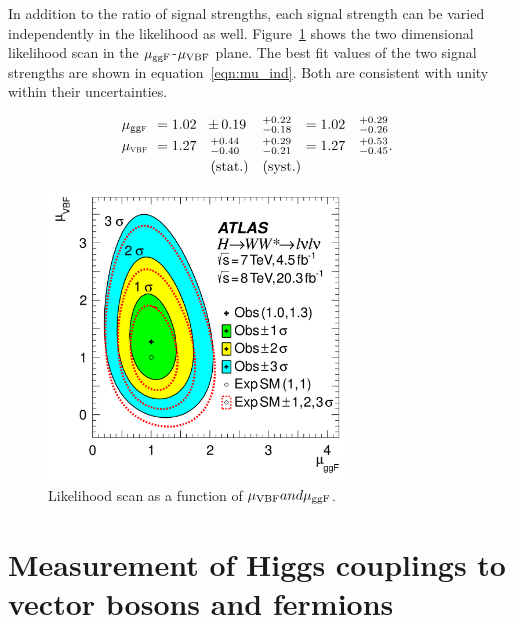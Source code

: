 In addition to the ratio of signal strengths, each signal strength can be varied independently in the likelihood as well. Figure~\ref{fig:mu_2d} shows the two dimensional likelihood scan in the $\mu_{{\rm ggF}}$-$\mu_{{\rm VBF}}$ plane. The best fit values of the two signal strengths are shown in equation~\ref{eqn:mu_ind}. Both are consistent with unity within their uncertainties. 


\begin{equation}
\begin{array}{llllll}
\no\mu_{\scggF}\no&=1.02\no&{\PM}0.19           \np&^{+0.22}_{-0.18}\np&=1.02&^{+0.29}_{-0.26} \\ \clineskip
\no\mu_{\scVX} \no&=1.27\no&\,\,^{+0.44}_{-0.40}\np&^{+0.29}_{-0.21}\np&=1.27&^{+0.53}_{-0.45}.\\ \clineskip
                     &        & ~\textrm{(stat.)}     &\textrm{(syst.)}\np
\end{array}
\label{eqn:mu_ind}
\end{equation}


\begin{figure}[h!]
  \centering
  \captionsetup{justification=centering}

  \includegraphics[width=0.7\textwidth]{figures/WW_muind}
  \caption{Likelihood scan as a function of $\mu_{{\rm VBF}} and \mu_{{\rm ggF}}$\cite{WW2015}.}
  \label{fig:mu_2d}
\end{figure}

\section{Measurement of Higgs couplings to vector bosons and fermions}





